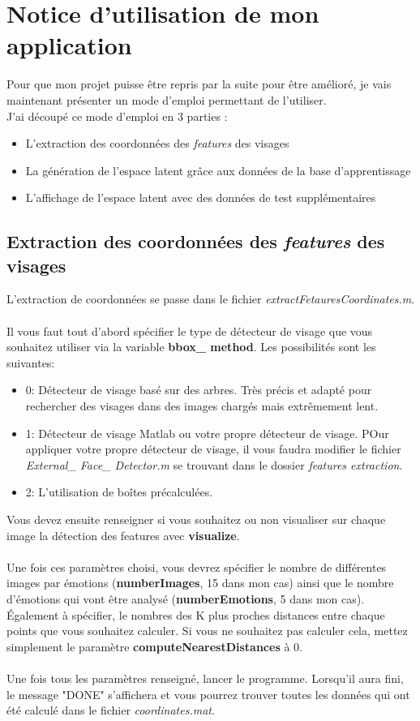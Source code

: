 \documentclass[poster]{polytech/polytech}
\begin{document}
\chapter{Notice d'utilisation de mon application}
Pour que mon projet puisse être repris par la suite pour être amélioré, je vais maintenant présenter un mode d'emploi permettant de l'utiliser.\\
J'ai découpé ce mode d'emploi en 3 parties : 
\begin{itemize}
\item L'extraction des coordonnées des \textit{features} des visages
\item La génération de l'espace latent grâce aux données de la base d'apprentissage
\item L'affichage de l'espace latent avec des données de test supplémentaires
\end{itemize}

\newpage
\section{Extraction des coordonnées des \textit{features} des visages}
L'extraction de coordonnées se passe dans le fichier \textit{extractFetauresCoordinates.m}.\\
\\
Il vous faut tout d'abord spécifier le type de détecteur de visage que vous souhaitez utiliser via la variable \textbf{bbox\_ method}. Les possibilités sont les suivantes:
\begin{itemize}
\item 0: Détecteur de visage basé sur des arbres. Très précis et adapté pour rechercher des visages dans des images chargés mais extrêmement lent.
\item 1: Détecteur de visage Matlab ou votre propre détecteur de visage. POur appliquer votre propre détecteur de visage, il vous faudra modifier le fichier \textit{External\_ Face\_ Detector.m} se trouvant dans le dossier \textit{features extraction}.
\item 2: L'utilisation de boîtes précalculées.\\
\end{itemize}
Vous devez ensuite renseigner si vous souhaitez ou non visualiser sur chaque image la détection des features avec \textbf{visualize}.\\
\\
Une fois ces paramètres choisi, vous devrez spécifier le nombre de différentes images par émotions (\textbf{numberImages}, 15 dans mon cas) ainsi que le nombre d'émotions qui vont être analysé (\textbf{numberEmotions}, 5 dans mon cas).\\
Également à spécifier, le nombres des K plus proches distances entre chaque points que vous souhaitez calculer. Si vous ne souhaitez pas calculer cela, mettez simplement le paramètre \textbf{computeNearestDistances} à 0.\\
\\
Une fois tous les paramètres renseigné, lancer le programme. Lorsqu'il aura fini, le message "DONE" s'affichera et vous pourrez trouver toutes les données qui ont été calculé dans le fichier \textit{coordinates.mat}.
\end{document}
